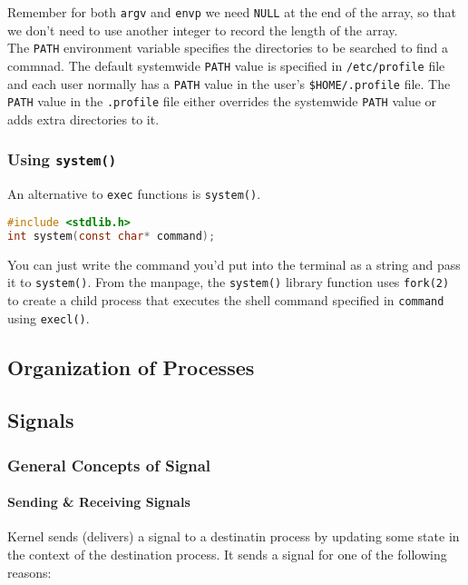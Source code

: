 \documentclass{article}
\newcommand{\code}[1]{\texttt{#1}}
\begin{document}
Remember for both \code{argv} and \code{envp} we need \code{NULL} at the end of the array, so that we don't need to use another integer to record the length of the array. \\ 

The \code{PATH} environment variable specifies the directories to be searched to find a commnad. The default systemwide \code{PATH} value is specified in \code{/etc/profile} file and each user normally has a \code{PATH} value in the user's \code{\$HOME/.profile} file. The \code{PATH} value in the \code{.profile} file either overrides the systemwide \code{PATH} value or adds extra directories to it. 

\subsubsection{Using \code{system()}}

An alternative to \code{exec} functions is \code{system()}.

\begin{lstlisting}[language=C]
#include <stdlib.h>
int system(const char* command);
\end{lstlisting}

You can just write the command you'd put into the terminal as a string and pass it to \code{system()}. From the manpage, the \code{system()} library function uses \code{fork(2)} to create a child process that executes the shell command specified in \code{command} using \code{execl()}. 

\subsection{Organization of Processes}

\subsection{Signals}

\subsubsection{General Concepts of Signal}

\paragraph{Sending \& Receiving Signals}

Kernel sends (delivers) a signal to a destinatin process by updating some state in the context of the destination process. It sends a signal for one of the following reasons:
\end{document}
